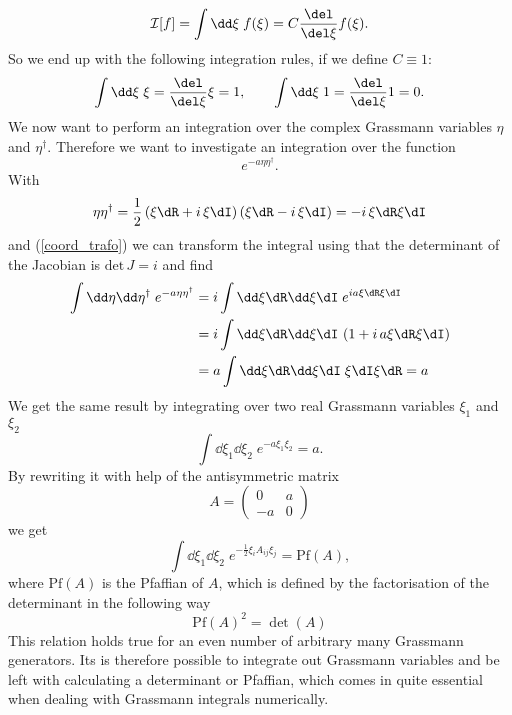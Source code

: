 \begin{equation}
\mathcal{I}[f]=\int \dd\xi\; f(\xi) = C\frac{\del }{\del\xi}f(\xi).
\end{equation}
So we end up with the following integration rules, if we define $C\equiv 1$:
\begin{equation}
\int \dd\xi\; \xi = \frac{\del }{\del\xi}\xi =1,\qquad \int \dd\xi\; 1 = \frac{\del }{\del\xi}1 =0.
\end{equation}
We now want to perform an integration over the complex Grassmann variables $\eta$ and $\eta^{\dagger}$. Therefore we want to investigate an integration over the function
\begin{equation}
e ^{-a\eta\eta^{\dagger}}.
\end{equation}
With
\begin{equation}
\eta\eta^{\dagger} = \frac{1}{2}\left(\xi\dR+i\,\xi\dI\right)\left(\xi\dR-i\, \xi\dI\right) = -i\,\xi\dR\xi\dI
\end{equation}
and (\ref{coord_trafo}) we can transform the integral using that the determinant of the Jacobian is $\mathrm{det}\,J=i$ and find
\begin{align}
\int \dd\eta\dd\eta^{\dagger}\;e ^{-a\eta\eta^{\dagger}} &= i\int \dd\xi\dR \dd\xi\dI\; e ^{ia\xi\dR\xi\dI}\notag \\
%
%
&=i\int\dd\xi\dR\dd\xi\dI\, \left( 1+ i\,a\xi\dR\xi\dI \right) \\
%
%
&=a \int\dd\xi\dR\dd\xi\dI \;\xi\dI\xi\dR = a \notag
\end{align}
We get the same result by integrating over two real Grassmann variables $\xi_{1}$ and $\xi_{2}$
\begin{equation}
\int \dd\xi_{1}\dd\xi_{2}\; e ^{-a\xi_{1}\xi_{2}}=a.
\end{equation}
By rewriting it with help of the antisymmetric matrix
\begin{equation}
A=\left(\begin{array}{cc}
0 & a \\
-a & 0
\end{array} \right)
\end{equation}
we get
\begin{equation}
\int \dd\xi_{1}\dd\xi_{2}\; e ^{-\frac{1}{2}\xi_{i}A_{ij}\xi_{j}} = \mathrm{Pf}\left(A\right),
\end{equation}
where $\mathrm{Pf}\left(A\right)$ is the Pfaffian of $A$, which is defined by the factorisation of the determinant in the following way
%
%
\begin{equation}
\mathrm{Pf}\left(A\right)^{2} = \det(A)
\end{equation}
This relation holds true for an even number of arbitrary many Grassmann generators. Its is therefore possible to integrate out Grassmann variables and be left with calculating a determinant or Pfaffian, which comes in quite essential when dealing with Grassmann integrals numerically.
%
%
%
%
%
%
%
%
